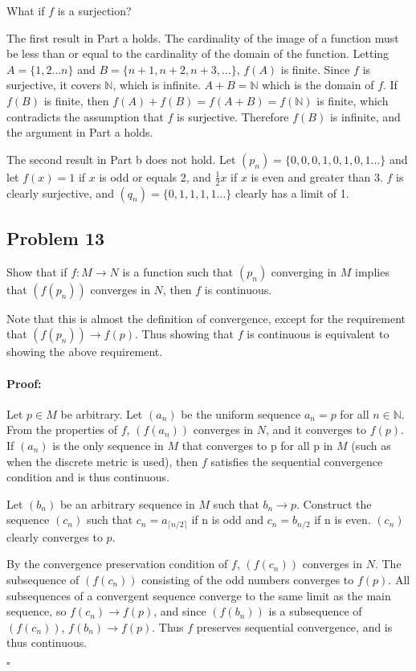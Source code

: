 \documentclass{article}
\newenvironment{proof}{\paragraph{Proof:}}{\hfill$\square$}
\begin{document}
What if $f$ is a surjection?

The first result in Part a holds. The cardinality of the image of a function must be less than or equal to the cardinality of the domain of the function. Letting $A = \{1, 2 \dots n\}$ and $B = \{n+1, n+2, n+3, \dots\}$, $f(A)$ is finite. Since $f$ is surjective, it covers $\mathbb{N}$, which is infinite. $A + B = \mathbb{N}$ which is the domain of $f$. If $f(B)$ is finite, then $f(A) + f(B) = f(A+B) = f(\mathbb{N})$ is finite, which contradicts the assumption that $f$ is surjective. Therefore $f(B)$ is infinite, and the argument in Part a holds.

The second result in Part b does not hold. Let $(p_n) = \{0, 0, 0, 1, 0, 1, 0, 1 \dots\}$ and let $f(x) = 1$ if $x$ is odd or equals 2, and $\frac{1}{2}x$ if $x$ is even and greater than 3. $f$ is clearly surjective, and $(q_n) = \{0, 1, 1, 1, 1\dots\}$ clearly has a limit of 1.

\subsection*{Problem 13}

Show that if $f: M\rightarrow N$ is a function such that $(p_n)$ converging in $M$ implies that $(f(p_n))$ converges in $N$, then $f$ is continuous.

Note that this is almost the definition of convergence, except for the requirement that $(f(p_n)) \rightarrow f(p)$. Thus showing that $f$ is continuous is equivalent to showing the above requirement.

\begin{proof}

Let $p\in M$ be arbitrary. Let $(a_n)$ be the uniform sequence $a_n = p$ for all $n\in\mathbb{N}$. From the properties of $f$, $(f(a_n))$ converges in $N$, and it converges to $f(p)$. If $(a_n)$ is the only sequence in $M$ that converges to p for all p in $M$ (such as when the discrete metric is used), then $f$ satisfies the sequential convergence condition and is thus continuous.

Let $(b_n)$ be an arbitrary sequence in $M$ such that $b_n \rightarrow p$. Construct the sequence $(c_n)$ such that $c_n = a_{\lceil n/2 \rceil}$ if n is odd and $c_n = b_{n/2}$ if n is even. $(c_n)$ clearly converges to $p$.

By the convergence preservation condition of $f$, $(f(c_n))$ converges in $N$. The subsequence of $(f(c_n))$ consisting of the odd numbers converges to $f(p)$. All subsequences of a convergent sequence converge to the same limit as the main sequence, so $f(c_n) \rightarrow f(p)$, and since $(f(b_n))$ is a subsequence of $(f(c_n))$, $f(b_n) \rightarrow f(p)$. Thus $f$ preserves sequential convergence, and is thus continuous.

\end{proof}
\end{document}
